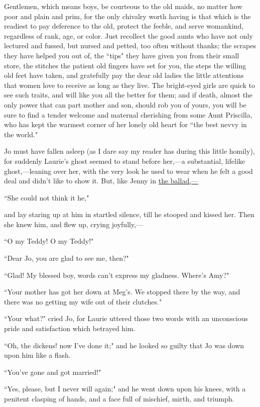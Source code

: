 Gentlemen, which means boys, be courteous to the old maids, no matter
how poor and plain and prim, for the only chivalry worth having is that
which is the readiest to pay deference to the old, protect the feeble,
and serve womankind, regardless of rank, age, or color. Just recollect
the good aunts who have not only lectured and fussed, but nursed and
petted, too often without thanks; the scrapes they have helped you out
of, the ``tips" they have given you from their small store, the stitches
the patient old fingers have set for you, the steps the willing old feet
have taken, and gratefully pay the dear old ladies the little attentions
that women love to receive as long as they live. The bright-eyed girls
are quick to see such traits, and will like you all the better for them;
and if death, almost the only power that can part mother and son, should
rob you of yours, you will be sure to find a tender welcome and maternal
cherishing from some Aunt Priscilla, who has kept the warmest corner of
her lonely old heart for ``the best nevvy in the world."

Jo must have fallen asleep (as I dare say my reader has during this
little homily), for suddenly Laurie's ghost seemed to
stand before her,---a substantial, lifelike ghost,---leaning over her,
with the very look he used to wear when he felt a good deal and
didn't like to show it. But, like Jenny in \underline{the
ballad,---}

``She could not think it he,"

and lay staring up at him in startled silence, till he stooped and
kissed her. Then she knew him, and flew up, crying joyfully,---

``O my Teddy! O my Teddy!"

``Dear Jo, you are glad to see me, then?"

``Glad! My blessed boy, words can't express my gladness.
Where's Amy?"

``Your mother has got her down at Meg's. We stopped there
by the way, and there was no getting my wife out of their clutches."

``Your what?" cried Jo, for Laurie uttered those two words with an
unconscious pride and satisfaction which betrayed him.

``Oh, the dickens! now I've done it;" and he looked so
guilty that Jo was down upon him like a flash.

``You've gone and got married!"

``Yes, please, but I never will again;" and he went down upon his knees,
with a penitent clasping of hands, and a face full of mischief, mirth,
and triumph.

